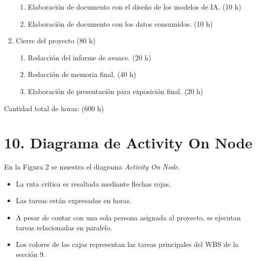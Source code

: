 \documentclass[
11pt, %
]{charter}
\begin{document}
\begin{enumerate}
\begin{enumerate}
			\item Elaboración de documento con el diseño de los modelos de IA. (10 h)
			\item Elaboración de documento con los datos consumidos. (10 h)
		\end{enumerate}
	\item Cierre del proyecto (80 h)
		\begin{enumerate}
			\item Redacción del informe de avance. (20 h)
			\item Redacción de memoria final. (40 h)
			\item Elaboración de presentación para exposición final. (20 h) 
		\end{enumerate}
\end{enumerate}

Cantidad total de horas: (600 h)


\section{10. Diagrama de Activity On Node}
\label{sec:AoN}

En la Figura 2 se muestra el diagrama \textit{Activity On Node}. 

\begin{itemize}
	\item La ruta crítica es resaltada mediante flechas rojas.
	\item Las tareas están expresadas en horas.
	\item A pesar de contar con una sola persona asignada al proyecto, se ejecutan tareas relacionadas en paralelo.
	\item Los colores de las cajas representan las tareas principales del WBS de la sección 9.
\end{itemize}



\end{document}
